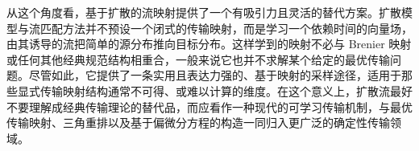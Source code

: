 从这个角度看，基于扩散的流映射提供了一个有吸引力且灵活的替代方案。扩散模型与流匹配方法并不预设一个闭式的传输映射，而是学习一个依赖时间的向量场，由其诱导的流把简单的源分布推向目标分布。这样学到的映射不必与 Brenier
映射或任何其他经典规范结构相重合，一般来说它也并不求解某个给定的最优传输问题。尽管如此，它提供了一条实用且表达力强的、基于映射的采样途径，适用于那些显式传输映射结构通常不可得、或难以计算的维度。在这个意义上，扩散流最好不要理解成经典传输理论的替代品，而应看作一种现代的可学习传输机制，与最优传输映射、三角重排以及基于偏微分方程的构造一同归入更广泛的确定性传输领域。
